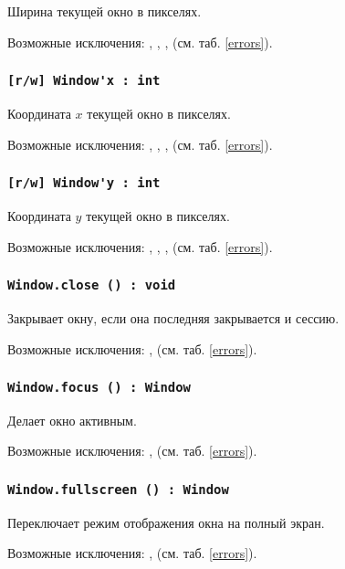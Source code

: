 Ширина текущей окно в пикселях.

Возможные исключения: , , ,  (см. таб. \ref{errors}).

\subsubsection{\lstinline|[r/w] Window'x : int|}

Координата $x$ текущей окно в пикселях.

Возможные исключения: , , ,  (см. таб. \ref{errors}).

\subsubsection{\lstinline|[r/w] Window'y : int|}

Координата $y$ текущей окно в пикселях.

Возможные исключения: , , ,  (см. таб. \ref{errors}).

\subsubsection{\lstinline|Window.close () : void|}

Закрывает окну, если она последняя закрывается и сессию.

Возможные исключения: ,  (см. таб. \ref{errors}).

\subsubsection{\lstinline|Window.focus () : Window|}

Делает окно активным.

Возможные исключения: ,  (см. таб. \ref{errors}).

\subsubsection{\lstinline|Window.fullscreen () : Window|}

Переключает режим отображения окна на полный экран.

Возможные исключения: ,  (см. таб. \ref{errors}).

